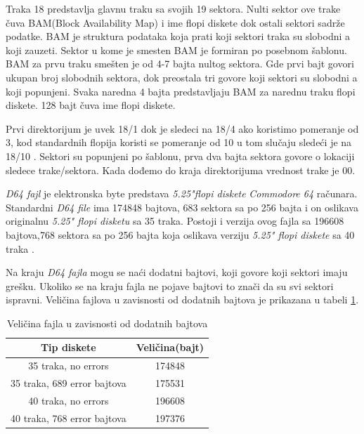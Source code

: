 Traka 18 predstavlja glavnu traku sa svojih 19 sektora. Nulti sektor ove trake čuva BAM(Block Availability Map) i ime flopi diskete dok ostali sektori sadrže podatke. BAM je struktura podataka koja prati koji sektori traka su slobodni a koji zauzeti. Sektor u kome je smesten BAM je formiran po posebnom šablonu. BAM za prvu traku smešten je od 4-7 bajta nultog sektora. Gde prvi bajt govori ukupan broj slobodnih sektora, dok preostala tri govore koji sektori su slobodni a koji popunjeni. Svaka naredna 4 bajta predstavljaju BAM za narednu traku flopi diskete. 128 bajt čuva ime flopi diskete.

Prvi direktorijum je uvek 18/1 dok je sledeci na 18/4 ako koristimo pomeranje od 3, kod standardnih flopija koristi se pomeranje od 10 u tom slučaju sledeći je na 18/10 . Sektori su popunjeni po šablonu, prva dva bajta sektora govore o lokaciji sledece trake/sektora. Kada dođemo do kraja direktorijuma vrednost trake je 00.

\textit{D64 fajl} je elektronska byte predstava \textit{5.25"flopi diskete} \textit{Commodore 64} računara. Standardni \textit{D64 file} ima 174848 bajtova, 683 sektora sa po 256 bajta i on oslikava originalnu \textit{5.25" flopi disketu} sa 35 traka.  Postoji i verzija ovog fajla sa 196608 bajtova,768 sektora sa po 256 bajta koja oslikava verziju \textit{5.25" flopi diskete} sa 40 traka \cite{D64}.

Na kraju \textit{D64 fajla} mogu se naći dodatni bajtovi, koji govore koji sektori imaju grešku. Ukoliko se na kraju fajla ne pojave bajtovi to znači da su svi sektori ispravni. Veličina fajlova u zavisnosti od dodatnih bajtova je prikazana u tabeli \ref{tab:error_velicina}.
\begin{table}[h!]
\begin{center}
\begin{tabular}{ | c | c |} 
\hline
Tip diskete & Veličina(bajt) \\
\hline
\hline
35 traka, no errors & 174848 \\
\hline
35 traka, 689 error bajtova & 175531 \\
\hline
40 traka, no errors & 196608 \\
\hline
40 traka, 768 error bajtova & 197376 \\
\hline
\end{tabular}
\end{center}
\caption{Veličina fajla u zavisnosti od dodatnih bajtova}
\label{tab:error_velicina}
\end{table}

